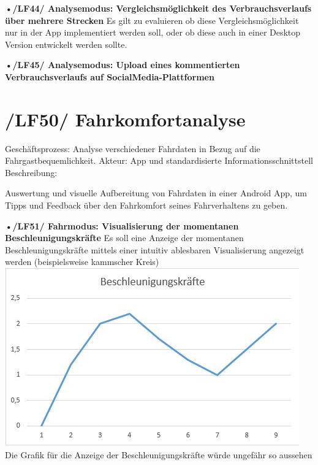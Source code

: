 \textbf{•/LF44/ Analysemodus: Vergleichsmöglichkeit des Verbrauchsverlaufs über mehrere Strecken}
\nextline
Es gilt zu evaluieren ob diese Vergleichsmöglichkeit nur in der App implementiert werden soll, oder ob diese auch in einer Desktop Version entwickelt werden sollte.

\textbf{•/LF45/ Analysemodus: Upload eines kommentierten Verbrauchsverlaufs auf SocialMedia-Plattformen }

\newpage

\section{/LF50/ Fahrkomfortanalyse}
Geschäftsprozess:	Analyse verschiedener Fahrdaten in Bezug auf die Fahrgastbequemlichkeit.
Akteur:			App und standardisierte Informationsschnittstell
Beschreibung:	

Auswertung und visuelle Aufbereitung von Fahrdaten in einer Android App, um Tipps und Feedback über den Fahrkomfort seines Fahrverhaltens zu geben.

\textbf{•/LF51/ Fahrmodus: Visualisierung der momentanen Beschleunigungskräfte}
\nextline
Es soll eine Anzeige der momentanen Beschleunigungskräfte mittels einer intuitiv ablesbaren Visualisierung angezeigt werden (beispielsweise kammscher Kreis)
\nextline
\includegraphics{images/LF51_Beschleunigung.jpg}
\nextline
Die Grafik für die Anzeige der Beschleunigungskräfte würde ungefähr so aussehen

